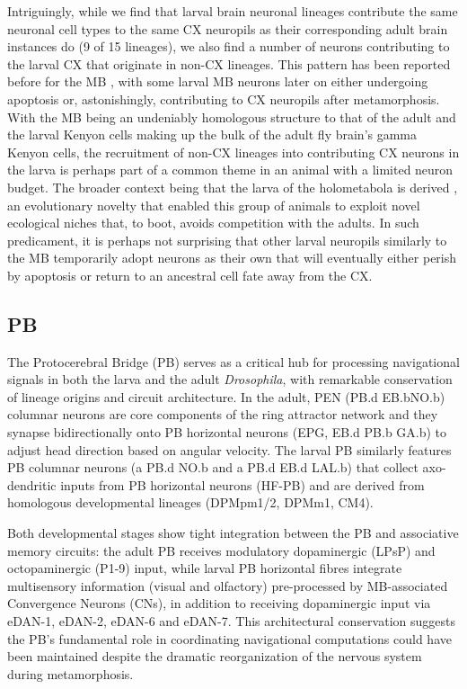 Intriguingly, while we find that larval brain neuronal lineages contribute the same neuronal cell types to the same CX neuropils as their corresponding adult brain instances do (9 of 15 lineages), we also find a number of neurons contributing to the larval CX that originate in non-CX lineages. This pattern has been reported before for the MB \citep{truman2023metamorphosis}, with some larval MB neurons later on either undergoing apoptosis or, astonishingly, contributing to CX neuropils after metamorphosis. With the MB being an undeniably homologous structure to that of the adult and the larval Kenyon cells making up the bulk of the adult fly brain's gamma Kenyon cells, the recruitment of non-CX lineages into contributing CX neurons in the larva is perhaps part of a common theme in an animal with a limited neuron budget. The broader context being that the larva of the holometabola is derived \citep{truman1999origins, truman2019evolution}, an evolutionary novelty that enabled this group of animals to exploit novel ecological niches that, to boot, avoids competition with the adults.
In such predicament, it is perhaps not surprising that other larval neuropils similarly to the MB temporarily adopt neurons as their own that will eventually either perish by apoptosis or return to an ancestral cell fate away from the CX.


        \subsection{PB}
        The Protocerebral Bridge (PB) serves as a critical hub for processing navigational signals in both the larva and the adult \textit{Drosophila}, with remarkable conservation of lineage origins and circuit architecture. In the adult, PEN (PB.d EB.bNO.b) columnar neurons are core components of the ring attractor network and they synapse bidirectionally onto PB horizontal neurons (EPG, EB.d PB.b GA.b) to adjust head direction based on angular velocity.  The larval PB similarly features PB columnar neurons (a PB.d NO.b and a PB.d EB.d LAL.b) that collect axo-dendritic inputs from PB horizontal neurons (HF-PB) and are derived from homologous developmental lineages (DPMpm1/2, DPMm1, CM4).

        Both developmental stages show tight integration between the PB and associative memory circuits: the adult PB receives modulatory dopaminergic (LPsP) and octopaminergic (P1-9) input, while larval PB horizontal fibres integrate multisensory information (visual and olfactory) pre-processed by MB-associated Convergence Neurons (CNs), in addition to receiving dopaminergic input via eDAN-1, eDAN-2, eDAN-6 and eDAN-7. This architectural conservation suggests the PB's fundamental role in coordinating navigational computations could have been maintained despite the dramatic reorganization of the nervous system during metamorphosis. 



